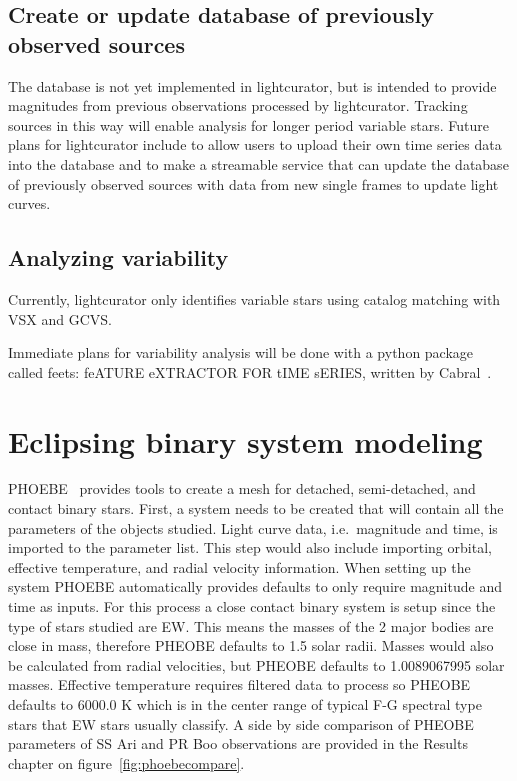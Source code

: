 \subsection{Create or update database of previously observed sources}
The database is not yet implemented in lightcurator, but is intended to 
provide magnitudes from previous observations processed by lightcurator.
Tracking sources in this way will enable analysis for longer period variable stars.
Future plans for lightcurator include to allow users to upload their own time series data into the database and
to make a streamable service that can update the database of previously observed sources with data from new single
frames to update light curves.

\subsection{Analyzing variability}
Currently, lightcurator only identifies variable stars using catalog
matching with VSX and GCVS\@. 

Immediate plans for variability analysis will be done with a python package 
called feets: feATURE eXTRACTOR FOR tIME sERIES,
written by Cabral~\cite{cabral_2018}.

\section{Eclipsing binary system modeling}
PHOEBE~\cite{prsa_2005, prsa_2016, horvat_2018} provides tools to create a mesh for detached, semi-detached, and contact binary stars.
First, a system needs to be created that will contain all the parameters of the objects studied.
Light curve data, i.e.\ magnitude and time, is imported to the parameter list.
This step would also include importing orbital, effective temperature, and radial velocity information.
When setting up the system PHOEBE automatically provides defaults to only require magnitude and time as inputs.
For this process a close contact binary system is setup since the type of stars studied are EW\@.
This means the masses of the 2 major bodies are close in mass, therefore PHEOBE defaults to 1.5 solar radii.
Masses would also be calculated from radial velocities, but PHEOBE defaults to 1.0089067995 solar masses.
Effective temperature requires filtered data to process so PHEOBE defaults to 6000.0 K which is in the center range of
typical F-G spectral type stars that EW stars usually classify.
A side by side comparison of PHEOBE parameters of SS Ari and PR Boo observations are provided in the Results chapter
on figure~\ref{fig:phoebecompare}.
